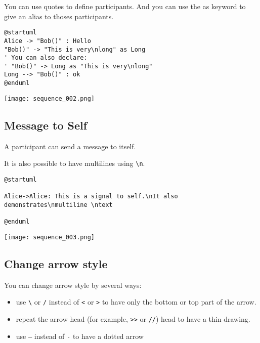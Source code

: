 You can use quotes to define participants. And you can use the as keyword to give an alias to thoses participants.


\begin{lstlisting}
@startuml
Alice -> "Bob()" : Hello
"Bob()" -> "This is very\nlong" as Long
' You can also declare:
' "Bob()" -> Long as "This is very\nlong"
Long --> "Bob()" : ok
@enduml
\end{lstlisting}

\begin{center}
\texttt{[image: sequence\_002.png]}
\end{center}

\subsection{Message to Self}
\begin{description}
	\item A participant can send a message to itself.
	\item It is also possible to have multilines using \texttt{\textbackslash n}.
\end{description}

\begin{lstlisting}
@startuml

Alice->Alice: This is a signal to self.\nIt also demonstrates\nmultiline \ntext

@enduml
\end{lstlisting}

\begin{center}
\texttt{[image: sequence\_003.png]}
\end{center}


\newpage \subsection{Change arrow style}
You can change arrow style by several ways:
\begin{itemize}
	\item use \texttt{\textbackslash} or \texttt{/} instead of \texttt{<} or
	\texttt{>} to have only the bottom or top part of the arrow.
	\item repeat the arrow head (for example, \texttt{>>} or \texttt{//}) head to
	have a thin drawing.
	\item use \texttt{--} instead of \texttt{-} to have a dotted arrow
\end{itemize}

